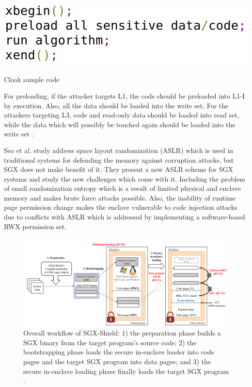 \begin{algorithm}[t]
	\includegraphics[scale=0.25]{images/cloakcode}
	\caption{Cloak sample code \cite{cloak}}
	\label{alg:cloak}
\end{algorithm}

For preloading, if the attacker targets L1, the code should be preloaded into L1-I by execution. Also, all the data should be loaded into the write set. For the attackers targeting L3, code and read-only data should be loaded into read set, while the data which will possibly be touched again should be loaded into the write set \cite{cloak}.

Seo et al. \cite{sgxshield} study address space layout randomization (ASLR) which is used in traditional systems for defending the memory against corruption attacks, but SGX does not make benefit of it. They present a new ASLR scheme for SGX systems and study the new challenges which come with it. Including the problem of small randomization entropy which is a result of limited physical and enclave memory and makes brute force attacks possible. Also, the inability of runtime page permission change makes the enclave vulnerable to code injection attacks due to conflicts with ASLR which is addressed by implementing a software-based RWX permission set.

\begin{figure}
	\includegraphics[scale=0.2]{images/sgxshield}
	\caption{Overall workflow of SGX-Shield: 1) the preparation phase builds a SGX binary from the target program’s source code; 2) the bootstrapping phase loads the secure in-enclave loader into code pages and the target SGX program into data pages; and 3) the secure in-enclave loading phase finally loads the target SGX program \cite{sgxshield}.}
	\label{fig:sgxshield}
\end{figure}

